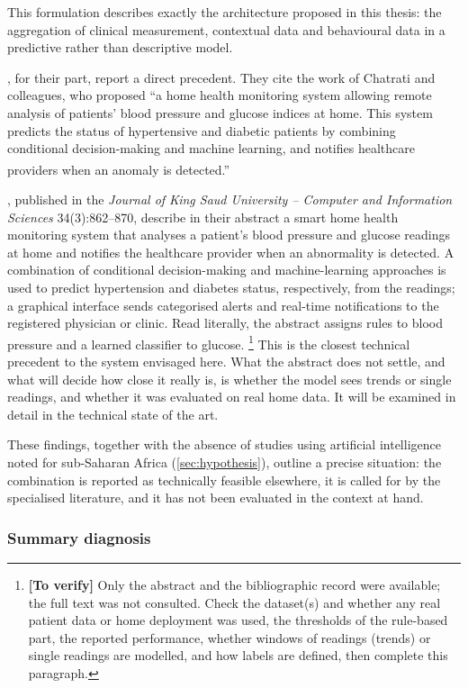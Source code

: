 \documentclass[12pt,a4paper,oneside]{report}
\newcommand{\verify}[1]{\footnote{\textbf{[To verify]} #1}}
\newcommand{\bq}[1]{``#1''\textsuperscript{\dag}}
\begin{document}
This formulation describes exactly the architecture proposed in this thesis: the aggregation of clinical measurement, contextual data and behavioural data in a predictive rather than descriptive model.

\textcite{liu2025review}, for their part, report a direct precedent. They cite the work of Chatrati and colleagues, who proposed \bq{a home health monitoring system allowing remote analysis of patients' blood pressure and glucose indices at home. This system predicts the status of hypertensive and diabetic patients by combining conditional decision-making and machine learning, and notifies healthcare providers when an anomaly is detected.}

\textcite{chatrati2022}, published in the \emph{Journal of King Saud University -- Computer and Information Sciences} 34(3):862--870, describe in their abstract a smart home health monitoring system that analyses a patient's blood pressure and glucose readings at home and notifies the healthcare provider when an abnormality is detected. A combination of conditional decision-making and machine-learning approaches is used to predict hypertension and diabetes status, respectively, from the readings; a graphical interface sends categorised alerts and real-time notifications to the registered physician or clinic. Read literally, the abstract assigns rules to blood pressure and a learned classifier to glucose.%
\verify{Only the abstract and the bibliographic record were available; the full text was not consulted. Check the dataset(s) and whether any real patient data or home deployment was used, the thresholds of the rule-based part, the reported performance, whether windows of readings (trends) or single readings are modelled, and how labels are defined, then complete this paragraph.}
This is the closest technical precedent to the system envisaged here. What the abstract does not settle, and what will decide how close it really is, is whether the model sees trends or single readings, and whether it was evaluated on real home data. It will be examined in detail in the technical state of the art.

These findings, together with the absence of studies using artificial intelligence noted for sub-Saharan Africa (\cref{sec:hypothesis}), outline a precise situation: the combination is reported as technically feasible elsewhere, it is called for by the specialised literature, and it has not been evaluated in the context at hand.

\subsubsection{Summary diagnosis}
\end{document}
